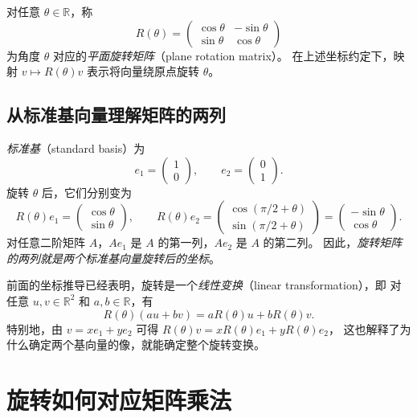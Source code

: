 \documentclass[UTF8,12pt,a4paper,fontset=fandol]{ctexart}
\begin{document}
\begin{definition}[平面旋转矩阵]
对任意 $\theta\in\mathbb R$，称
\begin{equation}
  R(\theta)=\begin{pmatrix}
    \cos\theta&-\sin\theta\\
    \sin\theta&\cos\theta
  \end{pmatrix}
  \label{eq:rotation-matrix}
\end{equation}
为角度 $\theta$ 对应的\emph{平面旋转矩阵}（plane rotation matrix）。
在上述坐标约定下，映射 $v\mapsto R(\theta)v$ 表示将向量绕原点旋转 $\theta$。
\end{definition}


\subsection{从标准基向量理解矩阵的两列}
\emph{标准基}（standard basis）为
\[
  e_1=\begin{pmatrix}1\\0\end{pmatrix},\qquad
  e_2=\begin{pmatrix}0\\1\end{pmatrix}.
\]
旋转 $\theta$ 后，它们分别变为
\[
  R(\theta)e_1=\begin{pmatrix}\cos\theta\\\sin\theta\end{pmatrix},\qquad
  R(\theta)e_2=
  \begin{pmatrix}\cos(\pi/2+\theta)\\\sin(\pi/2+\theta)\end{pmatrix}
  =\begin{pmatrix}-\sin\theta\\\cos\theta\end{pmatrix}.
\]
对任意二阶矩阵 $A$，$Ae_1$ 是 $A$ 的第一列，$Ae_2$ 是 $A$ 的第二列。
因此，\emph{旋转矩阵的两列就是两个标准基向量旋转后的坐标}。

前面的坐标推导已经表明，旋转是一个\emph{线性变换}（linear transformation），即
对任意 $u,v\in\mathbb R^2$ 和 $a,b\in\mathbb R$，有
\[
  R(\theta)(au+bv)=aR(\theta)u+bR(\theta)v.
\]
特别地，由 $v=xe_1+ye_2$ 可得
$R(\theta)v=xR(\theta)e_1+yR(\theta)e_2$，
这也解释了为什么确定两个基向量的像，就能确定整个旋转变换。

\section{旋转如何对应矩阵乘法}
\end{document}
